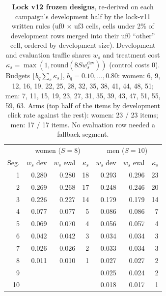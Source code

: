 \begin{table}[tb]
\caption{\textbf{Lock v12 frozen designs}, re-derived on each campaign's development half by the lock-v11 written rules (uf0 $\times$ uf3 cells, cells under 2\% of development rows merged into their uf0 ``other'' cell, ordered by development size). Development and evaluation traffic shares $w_s$ and treatment cost $\kappa_s = \max(1, \mathrm{round}(8 S w_s^{\text{dev}}))$ (control costs 0). Budgets $\lfloor b_q \sum_s \kappa_s \rfloor$, $b_q = 0.10, \dots, 0.80$: women: 6, 9, 12, 16, 19, 22, 25, 28, 32, 35, 38, 41, 44, 48, 51; men: 7, 11, 15, 19, 23, 27, 31, 35, 39, 43, 47, 51, 55, 59, 63. Arms (top half of the items by development click rate against the rest): women: 23 / 23 items; men: 17 / 17 items. No evaluation row needed a fallback segment.}
\label{tab:v12design}
\footnotesize
\setlength{\tabcolsep}{4pt}
\begin{tabular}{@{}rrrrrrr@{}}
\toprule
 & \multicolumn{3}{c}{women ($S = 8$)} & \multicolumn{3}{c}{men ($S = 10$)} \\
Seg. & $w_s$ dev & $w_s$ eval & $\kappa_s$ & $w_s$ dev & $w_s$ eval & $\kappa_s$ \\
\midrule
1 & 0.280 & 0.280 & 18 & 0.293 & 0.296 & 23 \\
2 & 0.269 & 0.268 & 17 & 0.248 & 0.246 & 20 \\
3 & 0.226 & 0.227 & 14 & 0.179 & 0.179 & 14 \\
4 & 0.077 & 0.077 & 5 & 0.086 & 0.086 & 7 \\
5 & 0.069 & 0.070 & 4 & 0.056 & 0.057 & 4 \\
6 & 0.042 & 0.042 & 3 & 0.034 & 0.034 & 3 \\
7 & 0.026 & 0.026 & 2 & 0.033 & 0.034 & 3 \\
8 & 0.011 & 0.010 & 1 & 0.027 & 0.027 & 2 \\
9 &  & &  & 0.025 & 0.024 & 2 \\
10 &  & &  & 0.018 & 0.017 & 1 \\
\bottomrule
\end{tabular}
\end{table}

